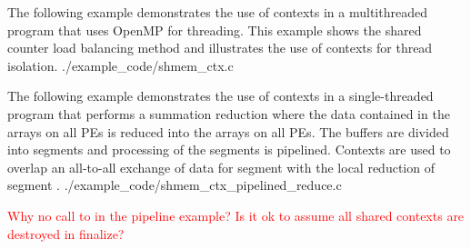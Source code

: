 \begin{apidefinition}
{}

\begin{apiexamples}

    \apicexample
    {The following example demonstrates the use of contexts in a multithreaded
    \Cstd program that uses OpenMP for threading.  This example shows the
    shared counter load balancing method and illustrates the use of contexts
    for thread isolation.}
    {./example_code/shmem_ctx.c}
    {}

    \apicexample
    {The following example demonstrates the use of contexts in a
    single-threaded \Cstd program that performs a summation reduction where
    the data contained in the  arrays on all PEs is reduced into
    the  arrays on all PEs.  The buffers are divided into
    segments and processing of the segments is pipelined.  Contexts are used
    to overlap an all-to-all exchange of data for segment  with the
    local reduction of segment .}
    {./example_code/shmem_ctx_pipelined_reduce.c}
    {}

\end{apiexamples}

\textcolor{red}{Why no call to  in the pipeline example?  Is
it ok to assume all shared contexts are destroyed in finalize?}

\end{apidefinition}
\color{black}
